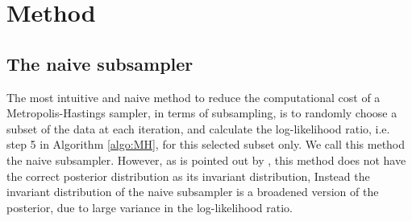\chapter{Method}\label{chap:method}
\label{sec:second}
\section{The naive subsampler}\label{subsec:naive}
The most intuitive and naive method to reduce the computational cost of a Metropolis-Hastings sampler, in terms of subsampling, is to randomly choose a subset of the data at each iteration, and calculate the log-likelihood ratio, i.e. step 5 in Algorithm \ref{algo:MH}, for this selected subset only. We call this method the naive subsampler.  However, as is pointed out by \cite{Bardenet:1}, this method does not have the correct posterior distribution as its invariant distribution, Instead the invariant distribution of the naive subsampler is a broadened version of the posterior, due to large variance in the log-likelihood ratio. 
